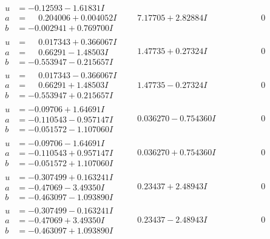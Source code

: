 \documentclass[1p]{elsarticle_modified}
\theoremstyle{definition}
\begin{document}
$$\begin{array}{c|c|c}
\begin{aligned}
u &= -0.12593 - 1.61831 I \\
a &= \phantom{-}0.204006 + 0.004052 I \\
b &= -0.002941 + 0.769700 I\end{aligned}
 & \phantom{-}7.17705 + 2.82884 I & \phantom{-0.000000 } 0 \\ \hline\begin{aligned}
u &= \phantom{-}0.017343 + 0.366067 I \\
a &= \phantom{-}0.66291 - 1.48503 I \\
b &= -0.553947 - 0.215657 I\end{aligned}
 & \phantom{-}1.47735 + 0.27324 I & \phantom{-0.000000 } 0 \\ \hline\begin{aligned}
u &= \phantom{-}0.017343 - 0.366067 I \\
a &= \phantom{-}0.66291 + 1.48503 I \\
b &= -0.553947 + 0.215657 I\end{aligned}
 & \phantom{-}1.47735 - 0.27324 I & \phantom{-0.000000 } 0 \\ \hline\begin{aligned}
u &= -0.09706 + 1.64691 I \\
a &= -0.110543 - 0.957147 I \\
b &= -0.051572 - 1.107060 I\end{aligned}
 & \phantom{-}0.036270 - 0.754360 I & \phantom{-0.000000 } 0 \\ \hline\begin{aligned}
u &= -0.09706 - 1.64691 I \\
a &= -0.110543 + 0.957147 I \\
b &= -0.051572 + 1.107060 I\end{aligned}
 & \phantom{-}0.036270 + 0.754360 I & \phantom{-0.000000 } 0 \\ \hline\begin{aligned}
u &= -0.307499 + 0.163241 I \\
a &= -0.47069 - 3.49350 I \\
b &= -0.463097 - 1.093890 I\end{aligned}
 & \phantom{-}0.23437 + 2.48943 I & \phantom{-0.000000 } 0 \\ \hline\begin{aligned}
u &= -0.307499 - 0.163241 I \\
a &= -0.47069 + 3.49350 I \\
b &= -0.463097 + 1.093890 I\end{aligned}
 & \phantom{-}0.23437 - 2.48943 I & \phantom{-0.000000 } 0 \\ \hline\begin{aligned}

\end{aligned}
\end{array}$$
\end{document}
